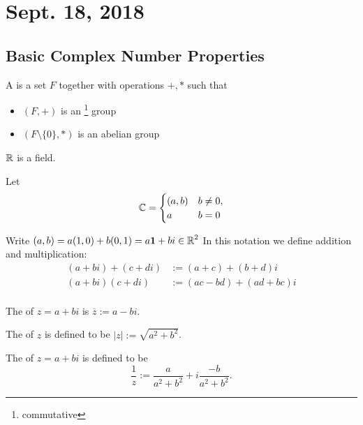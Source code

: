 \documentclass[notes]{subfiles}
\begin{document}
\section{Sept. 18, 2018}

\subsection{Basic Complex 
Number Properties}

\begin{definition}
    A  is a set $F$ together with operations $+,*$ such that
    \begin{itemize}
        \item $(F,+)$ is an \footnote{commutative} group
        \item $(F \setminus \{ 0 \}, *)$ is an abelian group
    \end{itemize}
\end{definition}

\begin{example}
    $\operatorname{\mathbb{R}}$ is a field.
\end{example}

\noindent
Let
\[ \operatorname{\mathbb{C}} = \begin{cases}
(a,b) & b \ne 0, \\
a & b = 0
\end{cases}
\]

\noindent
Write $(a,b) = a(1,0) + b(0,1) = a\mathbf{1} + bi \in \operatorname{\mathbb{R}}^2$
In this notation we define addition and multiplication:
\begin{align*}
    (a+bi) + (c+di) &:= (a+c) + (b+d)i \\
    (a+bi)(c+di) &:= (ac - bd) + (ad + bc)i \\
\end{align*}

\begin{definition}
    The  of $z = a + bi$ is $\overline{z} := a - bi$.
\end{definition}

\begin{definition}
    The  of $z$ is defined to be $|z| := \sqrt{a^2 + b^2}$.
\end{definition}

\begin{definition}
    The  of $z = a+bi$ is defined to be
    \[ \frac{1}{z} := \frac{a}{a^2 + b^2} + i \frac{-b}{a^2 + b^2}. \]
\end{definition}
\end{document}
